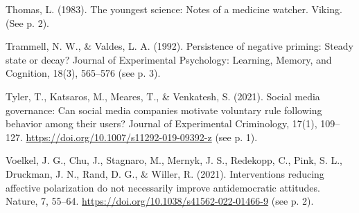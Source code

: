 \documentclass[reflection, authordate]{jote-new-article}
\begin{document}
Thomas, L. (1983). The youngest science: Notes of a medicine watcher. Viking. (See p. 2).

Trammell, N. W., \& Valdes, L. A. (1992). Persistence of negative priming: Steady state or decay? Journal of Experimental Psychology: Learning, Memory, and Cognition, 18(3), 565–576 (see p. 3).

Tyler, T., Katsaros, M., Meares, T., \& Venkatesh, S. (2021). Social media governance: Can social media companies motivate voluntary rule following behavior among their users? Journal of Experimental Criminology, 17(1), 109–127. \url{https://doi.org/10.1007/s11292-019-09392-z} (see p. 1).

Voelkel, J. G., Chu, J., Stagnaro, M., Mernyk, J. S., Redekopp, C., Pink, S. L., Druckman, J. N., Rand, D. G., \& Willer, R. (2021). Interventions reducing affective polarization do not necessarily improve antidemocratic attitudes. Nature, 7, 55–64. \url{https://doi.org/10.1038/s41562-022-01466-9} (see p. 2).
\end{document}
